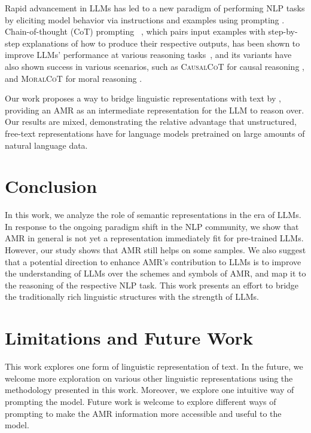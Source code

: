\begin{enumerate}
Rapid advancement in LLMs has led to a new paradigm of
performing NLP tasks by eliciting model behavior via instructions and examples using prompting \cite{brown2020gpt3,raffel2020exploring}.
Chain-of-thought (CoT) prompting ~\citep{wei2022chain,nye2021show}, which pairs input examples with step-by-step explanations of how to produce their respective outputs, has been shown to improve LLMs' performance at 
various reasoning tasks~\citep{yu-etal-2023-alert}, and its variants have also shown success in various scenarios, such as \textsc{CausalCoT} for causal reasoning \cite{jin2023cladder}, and \textsc{MoralCoT} for moral reasoning \cite{jin2022make}. 

Our work proposes a way to bridge linguistic representations with text by \ourmodel, 
providing an AMR as an intermediate representation for the LLM to reason over.
Our results are mixed, demonstrating the relative advantage that unstructured, free-text representations have for language models pretrained on large amounts of natural language data.



\section{Conclusion}
In this work, we analyze the role of semantic representations in the era of LLMs. In response to the ongoing paradigm shift in the NLP community, we show that AMR in general is not yet a representation immediately fit for pre-trained LLMs. However, our study shows that AMR still helps on some samples.
We also suggest that a potential direction to enhance AMR's contribution to LLMs is to improve the understanding of LLMs over the schemes and symbols of AMR, and map it to the reasoning of the respective NLP task. This work presents an effort to bridge the traditionally rich linguistic structures with the strength of LLMs.
\section*{Limitations and Future Work}
This work explores one form of linguistic representation of text. In the future, we welcome more exploration on various other linguistic representations using the methodology presented in this work. Moreover, we explore one intuitive way of prompting the model.
Future work is welcome to explore different ways of prompting to make the AMR information more accessible and useful to the model.


\end{enumerate}
